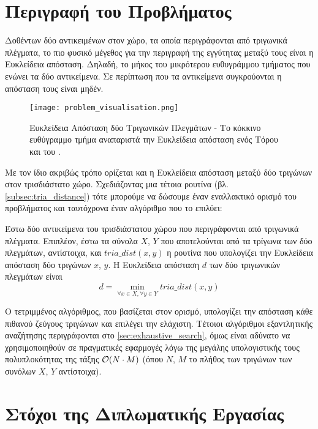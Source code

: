 \section{Περιγραφή του Προβλήματος}
Δοθέντων δύο αντικειμένων στον χώρο, τα οποία περιγράφονται από 
τριγωνικά πλέγματα, το πιο φυσικό μέγεθος για την περιγραφή της 
εγγύτητας μεταξύ τους είναι η Ευκλείδεια απόσταση. 
Δηλαδή, το μήκος του μικρότερου ευθυγράμμου τμήματος που ενώνει 
τα δύο αντικείμενα. Σε περίπτωση που τα αντικείμενα συγκρούονται 
η απόσταση τους είναι μηδέν.

\begin{figure}[h]
    \centering
    \texttt{[image: problem\_visualisation.png]}
    \caption[Οπτική Αναπαράσταση του Προβλήματος]{
        Ευκλείδεια Απόσταση δύο Τριγωνικών Πλεγμάτων - 
        Το κόκκινο ευθύγραμμο τμήμα αναπαριστά την Ευκλείδεια
        απόσταση ενός Τόρου και του .  
    }
\end{figure}

Με τον ίδιο ακριβώς τρόπο ορίζεται και η Ευκλείδεια απόσταση 
μεταξύ δύο τριγώνων στον τρισδιάστατο χώρο. 
Σχεδιάζοντας μια τέτοια ρουτίνα (βλ. \ref{subsec:tria_distance}) 
τότε μπορούμε να δώσουμε έναν εναλλακτικό ορισμό του προβλήματος
και ταυτόχρονα έναν αλγόριθμο που το επιλύει: 

\begin{definition}
    Έστω δύο αντικείμενα του τρισδιάστατου χώρου που περιγράφονται 
    από τριγωνικά πλέγματα. Επιπλέον, έστω τα σύνολα $X$, $Y$ που 
    αποτελούνται από τα τρίγωνα των δύο πλεγμάτων, αντίστοιχα, και 
    $tria\_dist(x,y)$ η ρουτίνα που υπολογίζει την Ευκλείδεια απόσταση
    δύο τριγώνων $x$, $y$.
    Η Ευκλείδεια απόσταση $d$ των δύο τριγωνικών πλεγμάτων είναι
    \[ d = \min_{\forall x \in X, \forall y \in Y} tria\_dist(x,y) \]    
\end{definition}

Ο τετριμμένος αλγόριθμος, που βασίζεται στον ορισμό, υπολογίζει την απόσταση 
κάθε πιθανού ζεύγους τριγώνων και επιλέγει την ελάχιστη. Τέτοιοι αλγόριθμοι 
εξαντλητικής αναζήτησης περιγράφονται στο \ref{sec:exhaustive_search}, όμως
είναι αδύνατο να χρησιμοποιηθούν σε πραγματικές εφαρμογές λόγω της μεγάλης 
υπολογιστικής τους πολυπλοκότητας της τάξης $\mathcal{O}(N \cdot M)$ (όπου $N$, $M$ το 
πλήθος των τριγώνων των συνόλων $X$, $Y$ αντίστοιχα).


\section{Στόχοι της Διπλωματικής Εργασίας}

